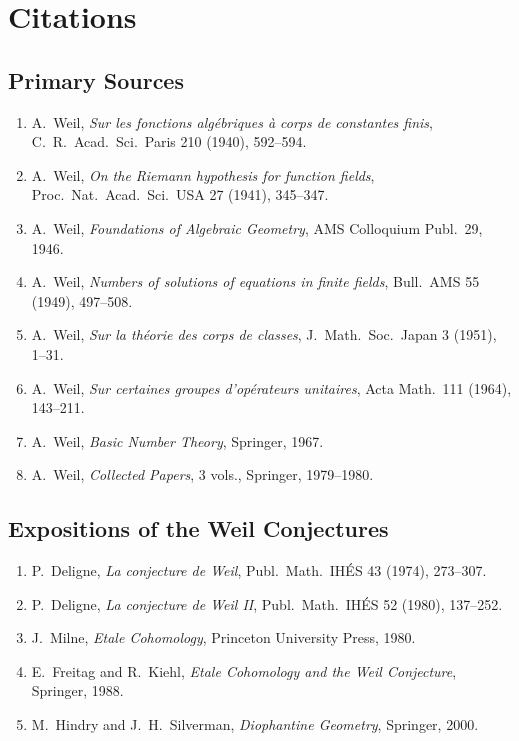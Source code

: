 \section{Citations}\subsection*{Primary Sources}
\begin{enumerate}
    \item A.\ Weil, \textit{Sur les fonctions alg\'{e}briques \`{a} corps de constantes finis}, C.\ R.\ Acad.\ Sci.\ Paris 210 (1940), 592--594.
    \item A.\ Weil, \textit{On the Riemann hypothesis for function fields}, Proc.\ Nat.\ Acad.\ Sci.\ USA 27 (1941), 345--347.
    \item A.\ Weil, \textit{Foundations of Algebraic Geometry}, AMS Colloquium Publ.\ 29, 1946.
    \item A.\ Weil, \textit{Numbers of solutions of equations in finite fields}, Bull.\ AMS 55 (1949), 497--508.
    \item A.\ Weil, \textit{Sur la th\'{e}orie des corps de classes}, J.\ Math.\ Soc.\ Japan 3 (1951), 1--31.
    \item A.\ Weil, \textit{Sur certaines groupes d'op\'{e}rateurs unitaires}, Acta Math.\ 111 (1964), 143--211.
    \item A.\ Weil, \textit{Basic Number Theory}, Springer, 1967.
    \item A.\ Weil, \textit{Collected Papers}, 3 vols., Springer, 1979--1980.
\end{enumerate}

\subsection*{Expositions of the Weil Conjectures}
\begin{enumerate}
    \item P.\ Deligne, \textit{La conjecture de Weil}, Publ.\ Math.\ IH\'{E}S 43 (1974), 273--307.
    \item P.\ Deligne, \textit{La conjecture de Weil II}, Publ.\ Math.\ IH\'{E}S 52 (1980), 137--252.
    \item J.\ Milne, \textit{Etale Cohomology}, Princeton University Press, 1980.
    \item E.\ Freitag and R.\ Kiehl, \textit{Etale Cohomology and the Weil Conjecture}, Springer, 1988.
    \item M.\ Hindry and J.\ H.\ Silverman, \textit{Diophantine Geometry}, Springer, 2000.
\end{enumerate}


